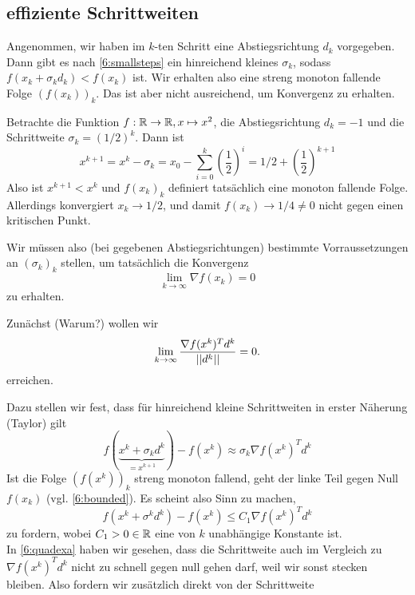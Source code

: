 \subsection{effiziente Schrittweiten}
Angenommen, wir haben im $k$-ten Schritt eine Abstiegsrichtung $d_k$ vorgegeben. Dann gibt es nach \cref{6:smallsteps} ein hinreichend kleines $\sigma_k$, sodass $f(x_k+\sigma_kd_k)<f(x_k)$ ist. Wir erhalten also eine streng monoton fallende Folge $(f(x_k))_k$. Das ist aber nicht ausreichend, um Konvergenz zu erhalten.
\begin{bsp}\label{6:quadexa}
	Betrachte die Funktion $f:\mathbb{R}\to \mathbb{R},x\mapsto x^2$, die Abstiegsrichtung $d_k = -1$ und die Schrittweite $\sigma_k = (1/2)^k$. Dann ist 
	\[
	x^{k+1} = x^k - \sigma_k = x_0 - \sum_{i=0}^{k} \left(\frac{1}{2}\right)^i = 1/2 + \left(\frac{1}{2}\right)^{k+1}
	\]
	Also ist $x^{k+1}<x^k$ und $f(x_k)_k$ definiert tatsächlich eine monoton fallende Folge. Allerdings konvergiert $x_k\to 1/2$, und damit $f(x_k)\to 1/4\neq0$ nicht gegen einen kritischen Punkt.
\end{bsp}
	Wir müssen also (bei gegebenen Abstiegsrichtungen) bestimmte Vorraussetzungen an $(\sigma_k)_k$ stellen, um tatsächlich die Konvergenz 
	\begin{equation}\label{6:cond}
	\lim_{k\to \infty}\nabla f(x_k) = 0
	\end{equation}
	zu erhalten. \par 
	Zunächst (\coms Warum?\come) wollen wir 
	\begin{equation}\label{6:precond}
	\lim_{k\to \infty}\frac{\nabla f(x^k)^Td^k}{\left|\left|d^k\right|\right|} = 0.
	\end{equation}
	erreichen. \par
	Dazu stellen wir fest, dass für hinreichend kleine Schrittweiten in erster Näherung (Taylor) gilt 
	\[
	f(\underbrace{x^k+\sigma_kd^k}_{=x^{k+1}})-f(x^k) \approx \sigma_k \nabla f(x^k)^Td^k
	\]
	Ist die Folge $(f(x^k))_k$ streng monoton fallend, geht der linke Teil gegen Null $f(x_k)$ (vgl. \cref{6:bounded}). Es scheint also Sinn zu machen, 
	\begin{equation}\label{6:condA}\tag{A}
		f(x^k+\sigma^kd^k)-f(x^k)\leq C_1 \nabla f(x^k)^Td^k
	\end{equation}
	zu fordern, wobei $C_1>0\in \mathbb{R}$ eine von $k$ unabhängige Konstante ist.\\
	In \cref{6:quadexa} haben wir gesehen, dass die Schrittweite auch im Vergleich zu $\nabla f(x^k)^Td^k$ nicht zu schnell gegen null gehen darf, weil wir sonst  stecken bleiben. Also fordern wir zusätzlich direkt von der Schrittweite
